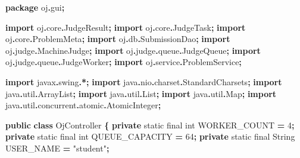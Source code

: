 \documentclass[
  11pt,
]{ctexart}
\newenvironment{Shaded}{\begin{snugshade}}{\end{snugshade}}
\newcommand{\BuiltInTok}[1]{#1}
\newcommand{\DataTypeTok}[1]{\textcolor[rgb]{0.13,0.29,0.53}{#1}}
\newcommand{\DecValTok}[1]{\textcolor[rgb]{0.00,0.00,0.81}{#1}}
\newcommand{\ImportTok}[1]{#1}
\newcommand{\KeywordTok}[1]{\textcolor[rgb]{0.13,0.29,0.53}{\textbf{#1}}}
\newcommand{\NormalTok}[1]{#1}
\newcommand{\OperatorTok}[1]{\textcolor[rgb]{0.81,0.36,0.00}{\textbf{#1}}}
\newcommand{\StringTok}[1]{\textcolor[rgb]{0.31,0.60,0.02}{#1}}
\begin{document}
\begin{Shaded}
\begin{Highlighting}[]
\KeywordTok{package}\ImportTok{ oj}\OperatorTok{.}\ImportTok{gui}\OperatorTok{;}

\KeywordTok{import} \ImportTok{oj}\OperatorTok{.}\ImportTok{core}\OperatorTok{.}\ImportTok{JudgeResult}\OperatorTok{;}
\KeywordTok{import} \ImportTok{oj}\OperatorTok{.}\ImportTok{core}\OperatorTok{.}\ImportTok{JudgeTask}\OperatorTok{;}
\KeywordTok{import} \ImportTok{oj}\OperatorTok{.}\ImportTok{core}\OperatorTok{.}\ImportTok{ProblemMeta}\OperatorTok{;}
\KeywordTok{import} \ImportTok{oj}\OperatorTok{.}\ImportTok{db}\OperatorTok{.}\ImportTok{SubmissionDao}\OperatorTok{;}
\KeywordTok{import} \ImportTok{oj}\OperatorTok{.}\ImportTok{judge}\OperatorTok{.}\ImportTok{MachineJudge}\OperatorTok{;}
\KeywordTok{import} \ImportTok{oj}\OperatorTok{.}\ImportTok{judge}\OperatorTok{.}\ImportTok{queue}\OperatorTok{.}\ImportTok{JudgeQueue}\OperatorTok{;}
\KeywordTok{import} \ImportTok{oj}\OperatorTok{.}\ImportTok{judge}\OperatorTok{.}\ImportTok{queue}\OperatorTok{.}\ImportTok{JudgeWorker}\OperatorTok{;}
\KeywordTok{import} \ImportTok{oj}\OperatorTok{.}\ImportTok{service}\OperatorTok{.}\ImportTok{ProblemService}\OperatorTok{;}

\KeywordTok{import} \ImportTok{javax}\OperatorTok{.}\ImportTok{swing}\OperatorTok{.*;}
\KeywordTok{import} \ImportTok{java}\OperatorTok{.}\ImportTok{nio}\OperatorTok{.}\ImportTok{charset}\OperatorTok{.}\ImportTok{StandardCharsets}\OperatorTok{;}
\KeywordTok{import} \ImportTok{java}\OperatorTok{.}\ImportTok{util}\OperatorTok{.}\ImportTok{ArrayList}\OperatorTok{;}
\KeywordTok{import} \ImportTok{java}\OperatorTok{.}\ImportTok{util}\OperatorTok{.}\ImportTok{List}\OperatorTok{;}
\KeywordTok{import} \ImportTok{java}\OperatorTok{.}\ImportTok{util}\OperatorTok{.}\ImportTok{Map}\OperatorTok{;}
\KeywordTok{import} \ImportTok{java}\OperatorTok{.}\ImportTok{util}\OperatorTok{.}\ImportTok{concurrent}\OperatorTok{.}\ImportTok{atomic}\OperatorTok{.}\ImportTok{AtomicInteger}\OperatorTok{;}

\KeywordTok{public} \KeywordTok{class}\NormalTok{ OjController }\OperatorTok{\{}
    \KeywordTok{private} \DataTypeTok{static} \DataTypeTok{final} \DataTypeTok{int}\NormalTok{ WORKER\_COUNT   }\OperatorTok{=} \DecValTok{4}\OperatorTok{;}
    \KeywordTok{private} \DataTypeTok{static} \DataTypeTok{final} \DataTypeTok{int}\NormalTok{ QUEUE\_CAPACITY }\OperatorTok{=} \DecValTok{64}\OperatorTok{;}
    \KeywordTok{private} \DataTypeTok{static} \DataTypeTok{final} \BuiltInTok{String}\NormalTok{ USER\_NAME   }\OperatorTok{=} \StringTok{"student"}\OperatorTok{;}


\end{Highlighting}
\end{Shaded}
\end{document}

